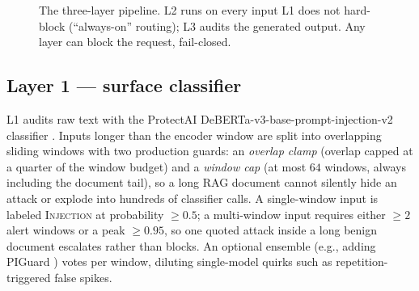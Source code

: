 \documentclass[conference]{IEEEtran}
\begin{document}
\begin{figure}[!t]
\centering
{}
\caption{The three-layer pipeline. L2 runs on every input L1 does not hard-block
(``always-on'' routing); L3 audits the generated output. Any layer can block the
request, fail-closed.}
\label{fig:pipeline}
\end{figure}

\subsection{Layer 1 --- surface classifier}
\label{sec:l1}
L1 audits raw text with the ProtectAI
DeBERTa-v3-base-prompt-injection-v2 classifier \cite{he2023}. Inputs longer than the encoder window are split into
overlapping sliding windows with two production guards: an \emph{overlap clamp}
(overlap capped at a quarter of the window budget) and a \emph{window cap}
(at most $64$ windows, always including the document tail), so a long RAG
document cannot silently hide an attack or explode into hundreds of classifier
calls. A single-window input is labeled \textsc{Injection} at probability
$\ge 0.5$; a multi-window input requires either $\ge 2$ alert windows or a
peak $\ge 0.95$, so one quoted attack inside a long benign document escalates
rather than blocks. An optional ensemble (e.g., adding PIGuard
\cite{li2025}) votes per window, diluting single-model quirks such as
repetition-triggered false spikes.
\end{document}
